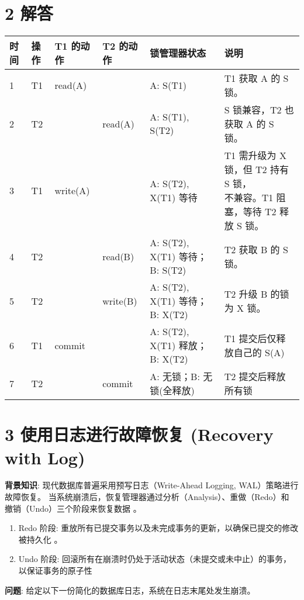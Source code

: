 \documentclass{article}
\begin{document}
	
	\section*{2 解答}
	
	\begin{table}[H]
		\centering
		\begin{tabular}{|l|l|l|l|l|l|}
			\hline
			时间 & 操作 & T1 的动作 & T2 的动作 & 锁管理器状态 & 说明  \\ \hline
			1 & T1 & read(A) & ~ & A: S(T1) & T1 获取 A 的 S 锁。 \\ \hline
			2 & T2 & ~ & read(A) & A: S(T1), S(T2) & S 锁兼容，T2 也获取 A 的 S 锁。 \\ \hline
			3 & T1 & write(A) & ~ & A: S(T2), X(T1) 等待 & \makecell[l]{T1 需升级为 X 锁，但 T2 持有 S 锁，\\不兼容。T1 阻塞，等待 T2 释放 S 锁}。 \\ \hline
			4 & T2 & ~ & read(B) &  A: S(T2), X(T1) 等待；B: S(T2) & T2 获取 B 的 S 锁。 \\ \hline
			5 & T2 & ~ & write(B) & A: S(T2), X(T1) 等待；B: X(T2) & T2 升级 B 的锁为 X 锁。 \\ \hline
			6 & T1 & commit & ~ & A: S(T2), X(T1) 释放；B: X(T2) & T1 提交后仅释放自己的 S(A) \\ \hline
			7 & T2 & ~ & commit & A: 无锁；B: 无锁(全释放) & T2 提交后释放所有锁 \\ \hline
		\end{tabular}
	\end{table}
	
	\section*{3 使用日志进行故障恢复 (Recovery with Log)}
	
	\textbf{背景知识}: 现代数据库普遍采用预写日志（Write-Ahead Logging, WAL）策略进行故障恢复。 当系统崩溃后，恢复管理器通过分析（Analysis）、重做（Redo）和 撤销（Undo）三个阶段来恢复数据 。
	
	\begin{enumerate}[noitemsep, label={{\arabic*})}]
		\item Redo 阶段: 重放所有已提交事务以及未完成事务的更新，以确保已提交的修改被持久化 。
		\item Undo 阶段: 回滚所有在崩溃时仍处于活动状态（未提交或未中止）的事务，以保证事务的原子性 
	\end{enumerate}\textbf{}
	
	\textbf{问题}: 给定以下一份简化的数据库日志，系统在日志末尾处发生崩溃。
	
\end{document}

